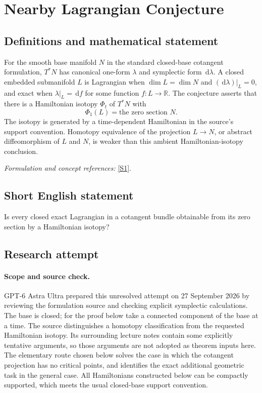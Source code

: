 \documentclass[11pt]{article}
\begin{document}
\section*{\texorpdfstring{Nearby Lagrangian Conjecture}{Nearby Lagrangian Conjecture}}\label{270}
\subsection{Definitions and mathematical statement}
For the smooth base manifold $N$ in the standard closed-base cotangent formulation, $T^*N$ has canonical one-form $\lambda$ and symplectic form ${\,\mathrm{d}}\lambda$. A closed embedded submanifold $L$ is Lagrangian when $\dim L=\dim N$ and $({\,\mathrm{d}}\lambda)|_L=0$, and exact when $\lambda|_L={\,\mathrm{d}} f$ for some function $f:L\to{\mathbb{R}}$. The conjecture asserts that there is a Hamiltonian isotopy $\Phi_t$ of $T^*N$ with
\[
 \Phi_1(L)=\text{the zero section }N.
\]
The isotopy is generated by a time-dependent Hamiltonian in the source's support convention. Homotopy equivalence of the projection $L\to N$, or abstract diffeomorphism of $L$ and $N$, is weaker than this ambient Hamiltonian-isotopy conclusion.
\par\smallskip\textit{Formulation and concept references:} \href{https://www.math.stonybrook.edu/~fzheng/seminar-f24/notes/week-1-2.pdf}{[S1]}.

\subsection{Short English statement}
Is every closed exact Lagrangian in a cotangent bundle obtainable from its zero section by a Hamiltonian isotopy?
\subsection{Research attempt}
\paragraph{Scope and source check.}
GPT-6 Astra Ultra prepared this unresolved attempt on 27 September 2026
by reviewing the formulation source and checking explicit symplectic
calculations. The base is closed; for the proof below take a connected
component of the base at a time. The source distinguishes a homotopy
classification from the requested Hamiltonian isotopy. Its surrounding
lecture notes contain some explicitly tentative arguments, so those
arguments are not adopted as theorem inputs here. The elementary route
chosen below solves the case in which the cotangent projection has no
critical points, and identifies the exact additional geometric task in
the general case. All Hamiltonians constructed below can be compactly
supported, which meets the usual closed-base support convention.
\end{document}
